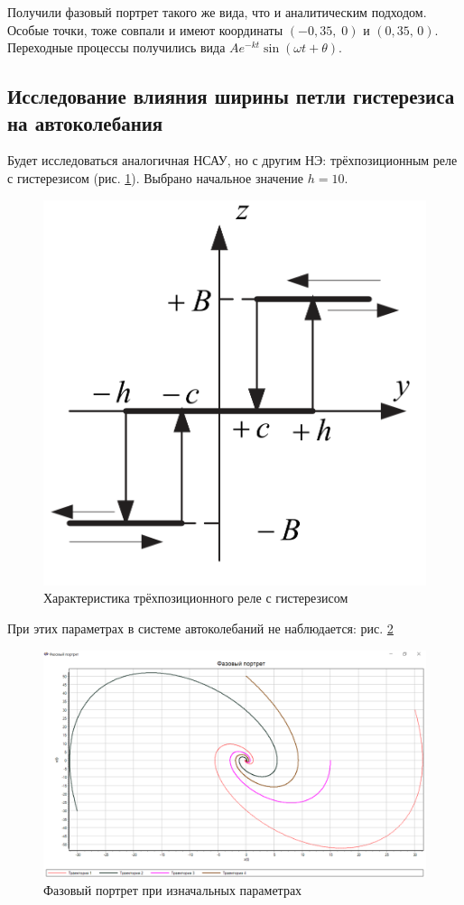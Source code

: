 	Получили фазовый портрет такого же вида, что и аналитическим подходом. Особые точки, тоже совпали и имеют координаты $(-0,35,\;0)$ и $(0,35,\,0)$. Переходные процессы получились вида $Ae^{-kt}\sin{(\omega t + \theta)}$.
	
	\subsection[Ширина петли гистерезиса и автоколебания]{Исследование влияния ширины петли гистерезиса на автоколебания}
	
	Будет исследоваться аналогичная НСАУ, но с другим НЭ: трёхпозиционным реле с гистерезисом (рис. \ref{NE2}). Выбрано начальное значение $h=10$.
	
	\begin{figure}[h]
		\centering\includegraphics[width=.45\textwidth]{png/НЭ2.png}
		\caption{Характеристика трёхпозиционного реле с гистерезисом}
		\label{NE2}
	\end{figure}
	
	При этих параметрах в системе автоколебаний не наблюдается: рис. \ref{s_lambda1}
	
	\begin{figure}[h]
		\centering\includegraphics[width=.7\textwidth]{png/FP_lambda1.png}
		\caption{Фазовый портрет при изначальных параметрах}
		\label{s_lambda1}
	\end{figure}
	
